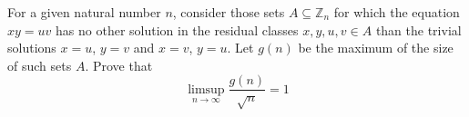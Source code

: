 For a given natural number $n$, consider those sets $A\subseteq \mathbb{Z}_n$ for which the equation $xy=uv$ has no other solution in the residual classes $x,y,u,v\in A$ than the trivial solutions $x=u$, $y=v$ and $x=v$, $y=u$. Let $g(n)$ be the maximum of the size of such sets $A$. Prove that
$$\limsup_{n\to\infty}\frac{g(n)}{\sqrt{n}}=1$$